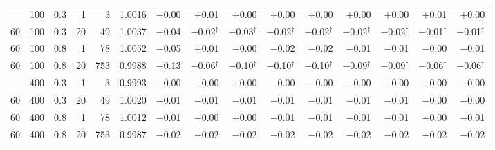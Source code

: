 \begin{tabular}{@{}rrrrr rrrrrrrrrr@{}}
\addlinespace[1pt]
60 & 100 & 0.3 & 1 & 3 & 1.0016 & $-$0.00 & +0.01 & +0.00 & +0.00 & +0.00 & +0.00 & +0.00 & +0.01 & +0.00 \\
60 & 100 & 0.3 & 20 & 49 & 1.0037 & $-$0.04 & $-$0.02$^{\dagger}$ & $-$0.03$^{\dagger}$ & $-$0.02$^{\dagger}$ & $-$0.02$^{\dagger}$ & $-$0.02$^{\dagger}$ & $-$0.02$^{\dagger}$ & $-$0.01$^{\dagger}$ & $-$0.01$^{\dagger}$ \\
60 & 100 & 0.8 & 1 & 78 & 1.0052 & $-$0.05 & +0.01 & $-$0.00 & $-$0.02 & $-$0.02 & $-$0.01 & $-$0.01 & $-$0.00 & $-$0.01 \\
60 & 100 & 0.8 & 20 & 753 & 0.9988 & $-$0.13 & $-$0.06$^{\dagger}$ & $-$0.10$^{\dagger}$ & $-$0.10$^{\dagger}$ & $-$0.10$^{\dagger}$ & $-$0.09$^{\dagger}$ & $-$0.09$^{\dagger}$ & $-$0.06$^{\dagger}$ & $-$0.06$^{\dagger}$ \\
\addlinespace[1pt]
60 & 400 & 0.3 & 1 & 3 & 0.9993 & $-$0.00 & $-$0.00 & +0.00 & $-$0.00 & $-$0.00 & $-$0.00 & $-$0.00 & $-$0.00 & $-$0.00 \\
60 & 400 & 0.3 & 20 & 49 & 1.0020 & $-$0.01 & $-$0.01 & $-$0.01 & $-$0.01 & $-$0.01 & $-$0.01 & $-$0.01 & $-$0.00 & $-$0.00 \\
60 & 400 & 0.8 & 1 & 78 & 1.0012 & $-$0.01 & $-$0.00 & +0.00 & $-$0.01 & $-$0.01 & $-$0.01 & $-$0.01 & $-$0.00 & $-$0.01 \\
60 & 400 & 0.8 & 20 & 753 & 0.9987 & $-$0.02 & $-$0.02 & $-$0.02 & $-$0.02 & $-$0.02 & $-$0.02 & $-$0.02 & $-$0.02 & $-$0.02 \\
\bottomrule
\end{tabular}
